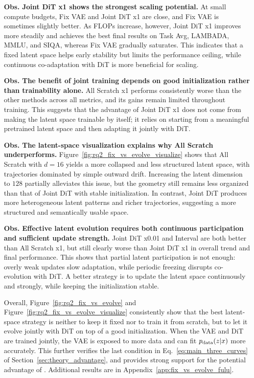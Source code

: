 \textbf{Obs.  Joint DiT x1 shows the strongest scaling potential.}
At small compute budgets, Fix VAE and Joint DiT x1 are close, and Fix VAE is sometimes slightly better. As FLOPs increase, however, Joint DiT x1 improves more steadily and achieves the best final results on Task Avg, LAMBADA, MMLU, and SIQA, whereas Fix VAE gradually saturates. This indicates that a fixed latent space helps early stability but limits the performance ceiling, while continuous co-adaptation with DiT is more beneficial for scaling.

\textbf{Obs.  The benefit of joint training depends on good initialization rather than trainability alone.}
All Scratch x1 performs consistently worse than the other methods across all metrics, and its gains remain limited throughout training. This suggests that the advantage of Joint DiT x1 does not come from making the latent space trainable by itself; it relies on starting from a meaningful pretrained latent space and then adapting it jointly with DiT.

\textbf{Obs.  The latent-space visualization explains why All Scratch underperforms.}
Figure~\ref{fig:rq2_fix_vs_evolve_visualize} shows that All Scratch with $d=16$ yields a more collapsed and less structured latent space, with trajectories dominated by simple outward drift. Increasing the latent dimension to $128$ partially alleviates this issue, but the geometry still remains less organized than that of Joint DiT with stable initialization. In contrast, Joint DiT produces more heterogeneous latent patterns and richer trajectories, suggesting a more structured and semantically usable space.

\textbf{Obs.  Effective latent evolution requires both continuous participation and sufficient update strength.}
Joint DiT x0.01 and Interval are both better than All Scratch x1, but still clearly worse than Joint DiT x1 in overall trend and final performance. This shows that partial latent participation is not enough: overly weak updates slow adaptation, while periodic freezing disrupts co-evolution with DiT. A better strategy is to update the latent space continuously and strongly, while keeping the initialization stable.

Overall, Figure~\ref{fig:rq2_fix_vs_evolve} and Figure~\ref{fig:rq2_fix_vs_evolve_visualize} consistently show that the best latent-space strategy is neither to keep it fixed nor to train it from scratch, but to let it evolve jointly with DiT on top of a good initialization. When the VAE and DiT are trained jointly, the VAE is exposed to more data and can fit $p_{\mathrm{data}}(z|x)$ more accurately. This further verifies the last condition in Eq.~\eqref{eq:main_three_curves} of Section~\ref{sec:theory_advantage}, and provides strong support for the potential advantage of \method. Additional results are in Appendix~\ref{app:fix_vs_evolve_fulu}.

